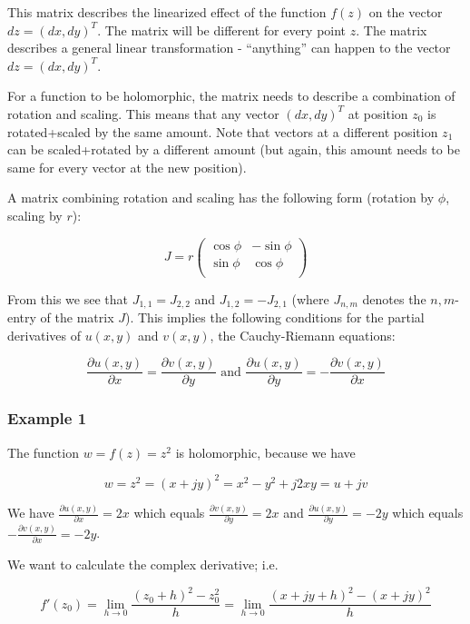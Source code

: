 This matrix describes the linearized effect of the function \(f(z)\) on
the vector \(dz = (dx, dy)^T\). The matrix will be different for every
point \(z\). The matrix describes a general linear transformation -
``anything'' can happen to the vector \(dz = (dx, dy)^T\).

For a function to be holomorphic, the matrix needs to describe a
combination of rotation and scaling. This means that any vector
\((dx, dy)^T\) at position \(z_0\) is rotated+scaled by the same amount.
Note that vectors at a different position \(z_1\) can be scaled+rotated
by a different amount (but again, this amount needs to be same for every
vector at the new position).

A matrix combining rotation and scaling has the following form (rotation
by \(\phi\), scaling by \(r\)):

\[
J = r \left(
\begin{array}{ccc}
\cos \phi & - \sin \phi \\
\sin \phi & \cos \phi \\
\end{array}\right)
\]

From this we see that \(J_{1,1} = J_{2,2}\) and \(J_{1,2} = -J_{2,1}\)
(where \(J_{n,m}\) denotes the \(n,m\)-entry of the matrix \(J\)). This
implies the following conditions for the partial derivatives of
\(u(x,y)\) and \(v(x,y)\), the Cauchy-Riemann equations:

\[
\frac{\partial u(x,y)}{\partial x} = \frac{\partial v(x,y)}{\partial y} \mbox{ and } \frac{\partial u(x,y)}{\partial y} = - \frac{\partial v(x,y)}{\partial x}
\]

\subsubsection{Example 1}

The function \(w = f(z) = z^2\) is holomorphic, because we have

\[
w = z^2 = (x+jy)^2 = x^2-y^2+j2xy = u + jv
\]

We have \(\frac{\partial u(x,y)}{\partial x}=2x\) which equals
\(\frac{\partial v(x,y)}{\partial y} = 2x\) and
\(\frac{\partial u(x,y)}{\partial y} = -2y\) which equals
\(- \frac{\partial v(x,y)}{\partial x} = -2y\).

We want to calculate the complex derivative; i.e.

\[
f'(z_0) = \lim_{h \rightarrow 0} \frac{(z_0+h)^2 - z_0^2}{h} = \lim_{h \rightarrow 0} \frac{(x+jy+h)^2 - (x+jy)^2}{h}
\]

